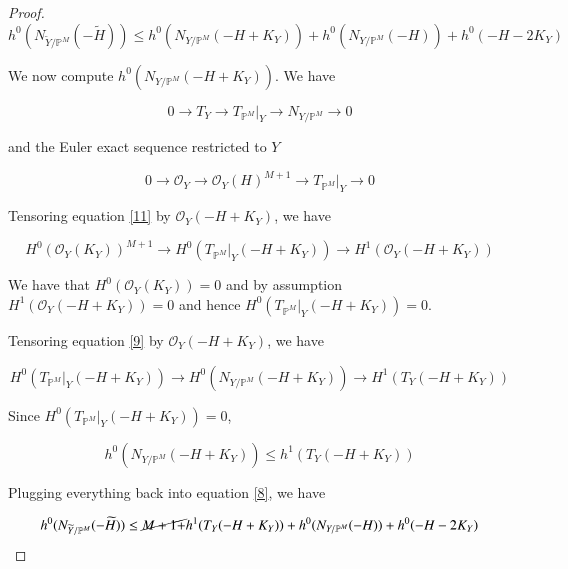 \documentclass[11pt,twoside]{amsart}
\theoremstyle{plain}
\numberwithin{equation}{section}
\theoremstyle{definition}
\begin{document}
\begin{proof}
\begin{equation}\label{8}
h^0(N_{\widetilde{Y}/\mathbb{P}^M}(-\widetilde{H})) \leq  h^0(N_{Y/\mathbb{P}^M}(-H+K_Y)) + h^0(N_{Y/\mathbb{P}^M}(-H)) + h^0(-H-2K_Y)
\end{equation}

We now compute $h^0(N_{Y/\mathbb{P}^M}(-H+K_Y))$. 
We have

\begin{equation}\label{9}
   0 \to T_Y \to T_{\mathbb{P}^M}|_Y \to N_{Y/\mathbb{P}^M} \to 0 
\end{equation}




and the Euler exact sequence restricted to $Y$

\begin{equation}\label{11}
   0 \to \mathcal{O}_Y \to \mathcal{O}_Y(H)^{M+1} \to T_{\mathbb{P}^M}|_Y \to 0 
\end{equation}





Tensoring equation \ref{11} by $\mathcal{O}_Y(-H+K_Y)$, we have 

\begin{equation*}
     H^0(\mathcal{O}_Y(K_Y))^{M+1} \to H^0(T_{\mathbb{P}^M}|_Y(-H+K_Y)) \to H^1(\mathcal{O}_Y(-H+K_Y)) 
\end{equation*}

We have that $H^0(\mathcal{O}_Y(K_Y)) = 0$ and by assumption $H^1(\mathcal{O}_Y(-H+K_Y)) = 0$ and hence $H^0(T_{\mathbb{P}^M}|_Y(-H+K_Y)) = 0$. 




Tensoring equation \ref{9} by $\mathcal{O}_Y(-H+K_Y)$, we have 

\begin{equation*}
    H^0(T_{\mathbb{P}^M}|_Y(-H+K_Y)) \to H^0(N_{Y/\mathbb{P}^M}(-H+K_Y)) \to H^1(T_Y(-H+K_Y))
\end{equation*}

Since $H^0(T_{\mathbb{P}^M}|_Y(-H+K_Y)) = 0$, 

\begin{equation}\label{14}
    h^0(N_{Y/\mathbb{P}^M}(-H+K_Y)) \leq h^1(T_Y(-H+K_Y))
\end{equation}

Plugging everything back into equation \ref{8}, we have

\begin{equation}\label{15}
h^0(N_{\widetilde{Y}/\mathbb{P}^M}(-\widetilde{H})) \leq  \cancel{M+1 +} h^1(T_Y(-H+K_Y)) + h^0(N_{Y/\mathbb{P}^M}(-H)) + h^0(-H-2K_Y)
\end{equation}



\end{proof}
\end{document}

